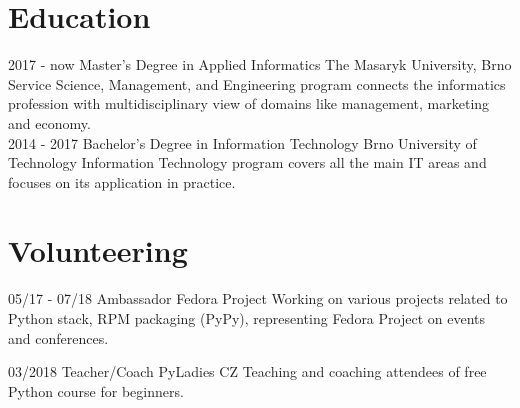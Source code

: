 \documentclass[]{friggeri-cv}
\begin{document}
\section{Education}
\begin{entrylist}
  \entry
    {2017 - now}
    {Master's Degree in Applied Informatics}
    {The Masaryk University, Brno}
    {Service Science, Management, and Engineering program connects the informatics profession with
    multidisciplinary view of domains like management, marketing and economy.\\}
  \entry
    {2014 - 2017}
    {Bachelor's Degree in Information Technology}
    {Brno University of Technology}
    {Information Technology program covers all the main IT areas and focuses on its application in practice.\\}
\end{entrylist}

\section{Volunteering}
\begin{entrylist}
    \entry
    {05/17 - 07/18}
    {Ambassador}
    {Fedora Project}
    {Working on various projects related to Python stack, RPM packaging (PyPy), representing Fedora
    Project on events and conferences.\\}

  \entry
    {03/2018}
    {Teacher/Coach}
    {PyLadies CZ}
    {Teaching and coaching attendees of free Python course for beginners.\\}

\end{entrylist}

\end{document}
